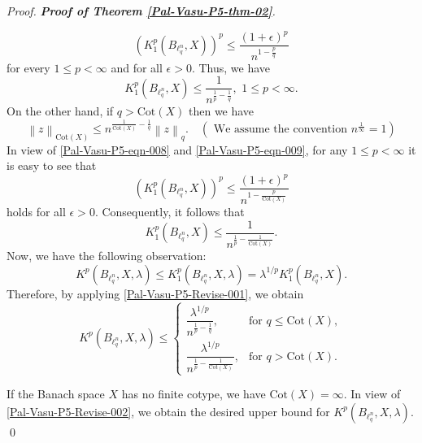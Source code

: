 \documentclass[a4paper,12pt]{amsart}
\theoremstyle{definition}
\newenvironment{pf}[1][]{%
 \vskip 3mm
 \noindent
 \ifthenelse{\equal{#1}{}}%
  {{\slshape Proof. }}%
  {{\slshape #1.} }%
 }%
{\qed\bigskip}
\newcommand{\norm}[1]{\left\lVert#1\right\rVert}
\begin{document}
\begin{pf}[{\bf Proof of Theorem \ref{Pal-Vasu-P5-thm-02}}]
\begin{equation*}
	\left(K^p_{1}(B_{\ell^n_q}, X)\right)^p \leq \frac{(1+\epsilon)^p}{n^{1-\frac{p}{q}}}
\end{equation*}
for every $1\leq p<\infty$ and for all $\epsilon>0$. Thus, we have
\begin{equation*}
	K^p_{1}(B_{\ell^n_q}, X)\leq \frac{1}{n^{\frac{1}{p}-\frac{1}{q}}}, \,\, 1\leq p<\infty.
\end{equation*}
On the other hand, if $q>\text{Cot}(X)$ then we have 
\begin{equation*}
	\norm{z}_{\text{Cot}(X)}\leq n^{\frac{1}{\text{Cot}(X)}-\frac{1}{q}}\norm{z}_q. \quad (\mbox{ We assume the convention}\,\, n^{\frac{1}{\infty}}=1)
\end{equation*} 
In view of \eqref{Pal-Vasu-P5-eqn-008} and \eqref{Pal-Vasu-P5-eqn-009}, for any $1\leq p<\infty$ it is easy to see that
\begin{equation*}
	\left(K^p_{1}(B_{\ell^n_q}, X)\right)^p \leq \frac{(1+\epsilon)^p}{n^{1-\frac{p}{\text{Cot}(X)}}}
\end{equation*}
holds for all $\epsilon>0$. Consequently, it follows that
\begin{equation*}
	K^p_{1}(B_{\ell^n_q}, X) \leq \frac{1}{n^{\frac{1}{p}-\frac{1}{\text{Cot}(X)}}}.
\end{equation*}
Now, we have the following observation:
\begin{equation}\label{Pal-Vasu-P5-Revise-001}
	K^p(B_{\ell^n_q},X,\lambda)\leq K^p_{1}(B_{\ell^n_q},X,\lambda)=\lambda^{1/p}K^p_{1}(B_{\ell^n_q},X).
\end{equation}
Therefore, by applying \eqref{Pal-Vasu-P5-Revise-001}, we obtain 
\begin{equation}
	K^p(B_{\ell^n_q},X,\lambda)\leq 
	\begin{cases}
		\dfrac{\lambda^{1/p}}{n^{\frac{1}{p}-\frac{1}{q}}}, & \text{for } q \leq \text{Cot}(X), \\[4mm]
		\dfrac{\lambda^{1/p}}{n^{\frac{1}{p}-\frac{1}{\text{Cot}(X)}}}, & \text{for } q > \text{Cot}(X).
	\end{cases}
	\label{Pal-Vasu-P5-Revise-002}
\end{equation}


If the Banach space $X$ has no finite cotype, we have $\text{Cot}(X)=\infty$. In view of \eqref{Pal-Vasu-P5-Revise-002}, we obtain the desired upper bound for $K^p(B_{\ell^n_q},X,\lambda)$.\\ 


\end{pf}
\end{document}

